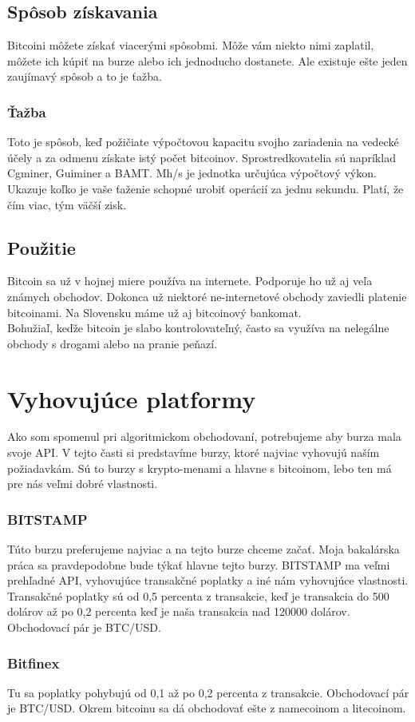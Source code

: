 \subsection{Spôsob získavania} 
Bitcoini môžete získať viacerými spôsobmi. Môže vám niekto nimi zaplatil, môžete ich kúpiť na burze alebo ich jednoducho dostanete. Ale existuje ešte jeden zaujímavý spôsob a to je ťažba. 
\subsubsection{Ťažba} 
Toto je spôsob, keď požičiate výpočtovou kapacitu svojho zariadenia na vedecké účely a za odmenu získate istý počet bitcoinov. 
 Sprostredkovatelia sú napríklad  Cgminer, Guiminer a BAMT. Mh/s je jednotka určujúca výpočtový výkon. Ukazuje koľko je vaše ťaženie schopné urobiť operácií za jednu sekundu. Platí, že čím viac, tým väčší zisk. 
\subsection{Použitie} 
Bitcoin sa už v hojnej miere používa na internete. Podporuje ho už aj veľa známych obchodov. Dokonca už niektoré ne-internetové obchody zaviedli platenie bitcoinami. Na Slovensku máme už aj bitcoinový bankomat. 
 \\ 
Bohužiaľ, keďže bitcoin je slabo kontrolovateľný, často sa využíva na nelegálne obchody s drogami alebo na pranie peňazí. \cite{B} 
\section{Vyhovujúce platformy} 
Ako som spomenul pri algoritmickom obchodovaní, potrebujeme aby burza mala svoje API. V tejto časti si predstavíme burzy, ktoré najviac vyhovujú naším požiadavkám. Sú to burzy s krypto-menami a hlavne s bitcoinom, lebo ten má pre nás veľmi dobré vlastnosti. 
\subsubsection{BITSTAMP} 
Túto burzu preferujeme najviac a na tejto burze chceme začať. Moja bakalárska práca sa pravdepodobne bude týkať hlavne tejto burzy. BITSTAMP ma veľmi prehľadné API, vyhovujúce transakčné poplatky a iné nám vyhovujúce vlastnosti. Transakčné poplatky sú od 0,5 percenta z transakcie, keď je transakcia do 500 dolárov až po 0,2 percenta keď je naša transakcia nad 120000 dolárov. Obchodovací pár je BTC/USD. \cite{Bit} 
\subsubsection{Bitfinex} 
Tu sa poplatky pohybujú od 0,1 až po 0,2 percenta z transakcie. Obchodovací pár je BTC/USD. Okrem bitcoinu sa dá obchodovať ešte z namecoinom a litecoinom. \cite{Bitf} 
